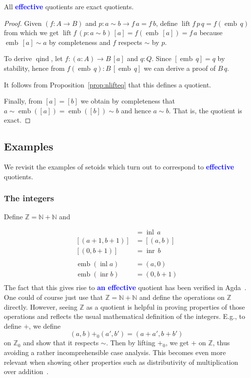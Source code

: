 \documentclass[envcountsame]{llncs}
\newcommand{\amend}[2][]{\textcolor{blue}{#2}}
\newcommand{\definable}{\amend[]{\textbf{effective }}}
\newcommand{\adefinable}{\amend[]{\textbf{an effective }}}
\newcommand{\N}{\mathbb{N}}
\newcommand{\Z}{\mathbb{Z}}
\providecommand{\class}[1]{[#1]}
\DeclareMathOperator{\qind}{qind}
\DeclareMathOperator{\emb}{emb}
\DeclareMathOperator{\inl}{inl}
\DeclareMathOperator{\inr}{inr}
\DeclareMathOperator{\lift}{lift}
\renewcommand{\equiv}{=}
\begin{document}
\begin{proposition}\label{prop:definableimpliesexact}
All \definable quotients are exact quotients.
\end{proposition}
\begin{proof}

Given $(f\colon A \to B)$ and $p : a\sim b \to f\,a \equiv f\,b$, define $\lift f\, p \,q = f (\emb\,q)$ from which we get $\lift f \,(p : a \sim b)\,\class a\equiv f(\emb\,\class a)\equiv f\,a$ because $\emb\,\class a\sim a$ by completeness and $f$ respects $\sim$ by $p$.

To derive $\qind$, let $f:(a\colon A)\to B\,\class a$ and $q:Q$. Since $ \class{\emb\,q} \equiv q$ by stability, hence from $f (\emb\,q):B\,\class{\emb\,q}$ we can derive a proof of $B\,q$.

It follows from Proposition~\ref{prop:nlifteq} that this defines a quotient.

Finally, from $\class a \equiv \class b$
we obtain by completeness that $a\sim\emb(\class a)\equiv\emb(\class b)\sim b$ and hence $a\sim b$. That is, the quotient is exact.
\end{proof}


\subsection{Examples}\label{sec:dquotients:examples}

We revisit the examples of setoids which turn out to correspond to
\definable quotients.

\subsubsection*{The integers}
Define $\Z =\N + \N $ and

\begin{align*}
\class{(a,0)} &= \inl\,a\\
\class{(a+1,b+1)} &= \class{(a,b)}\\
\class{(0,b+1)} &= \inr\,b\\\\
\emb (\inl a) &= (a,0)\\
\emb (\inr b) &= (0,b+1)\\
\end{align*}
The fact that this gives rise to \adefinable quotient has been verified in Agda~\cite{nuo2010report}.
 One could of course just use that $\Z=\N + \N$ and define the operations on $\Z$ directly. However, seeing  $\Z$ as a quotient is helpful in proving properties of those operations and reflects the usual mathematical definition of the integers. E.g., to define $+$, we define
\[(a,b){+_0}(a', b')= (a+a',b+b')\]
on $\Z_0$ and show that it respects $\sim$. Then by lifting $+_0$, we get $+$ on $\Z$, thus avoiding a rather incomprehensible case analysis. This becomes even more relevant when showing other properties such as distributivity of multiplication over addition~\cite{nuo2010report}.
\end{document}
